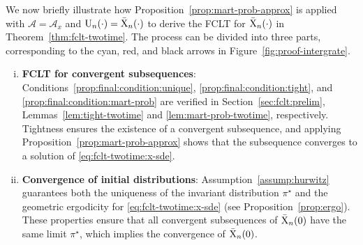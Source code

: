 \documentclass[11pt]{article}
\theoremstyle{plain}
\theoremstyle{definition}
\def\Figref#1{Figure~\ref{#1}}
\def\AM{{\mathcal A}}
\newcommand{\xbar}{{\bar{\textnormal{X}}}}
\newcommand{\uu}{{\textnormal{U}}}
\def\weakconverge{\Rightarrow}
\begin{document}
We now briefly illustrate how Proposition~\ref{prop:mart-prob-approx} is applied with $\AM = \AM_x$ and $\uu_{n}(\cdot) = \xbar_{n}(\cdot)$ to derive the FCLT for $\xbar_{n}(\cdot)$ in Theorem~\ref{thm:fclt-twotime}. The process can be divided into three parts, corresponding to the cyan, red, and black arrows in \Figref{fig:proof-intergrate}.

\begin{enumerate}[(i)]
	\item \textbf{FCLT for convergent subsequences}:
	Conditions~\ref{prop:final:condition:unique}, \ref{prop:final:condition:tight}, and \ref{prop:final:condition:mart-prob} are verified in Section~\ref{sec:fclt:prelim}, Lemmas~\ref{lem:tight-twotime} and \ref{lem:mart-prob-twotime}, respectively. Tightness ensures the existence of a convergent subsequence, and applying Proposition~\ref{prop:mart-prob-approx} shows that the subsequence converges to a solution of \eqref{eq:fclt-twotime:x-sde}.
	
	
	\item \textbf{Convergence of initial distributions}: 
	Assumption~\ref{assump:hurwitz} guarantees both the uniqueness of the invariant distribution $\pi^\star$ and the geometric ergodicity for \eqref{eq:fclt-twotime:x-sde} (see Proposition~\ref{prop:ergo}). These properties ensure that all convergent subsequences of $\xbar_{n}(0)$ have the same limit $\pi^\star$, which implies the convergence of $\xbar_{n}(0)$.
	

\end{enumerate}
\end{document}
